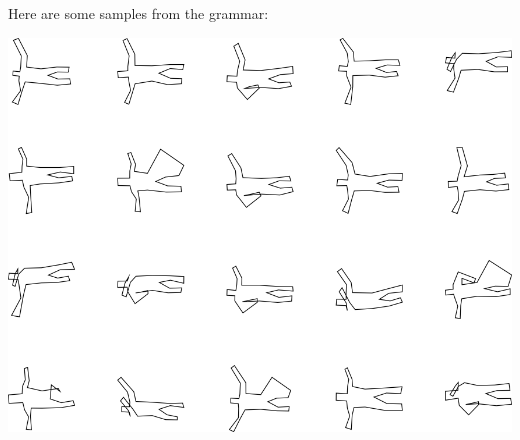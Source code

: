 Here are some samples from the grammar:

\includegraphics[width=6in]{output/3.learning/incremental/gram.19.d/samples.png}

